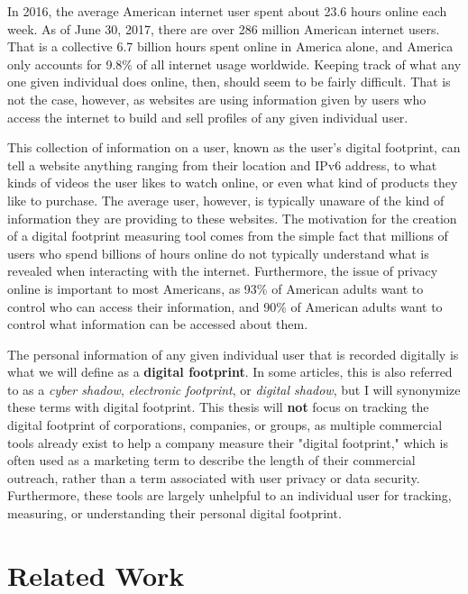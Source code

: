 \documentclass[11pt]{article}
\begin{document}
In 2016, the average American internet user spent about 23.6 hours online each week\cite{digital-future}. As of June 30, 2017, there are over 286 million American internet users. That is a collective 6.7 billion hours spent online in America alone, and America only accounts for 9.8\% of all internet usage worldwide\cite{internet-world-stats}. Keeping track of what any one given individual does online, then, should seem to be fairly difficult. That is not the case, however, as websites are using information given by users who access the internet to build and sell profiles of any given individual user. 

This collection of information on a user, known as the user's digital footprint, can tell a website anything ranging from their location and IPv6 address, to what kinds of videos the user likes to watch online, or even what kind of products they like to purchase. The average user, however, is typically unaware of the kind of information they are providing to these websites. The motivation for the creation of a digital footprint measuring tool comes from the simple fact that millions of users who spend billions of hours online do not typically understand what is revealed when interacting with the internet. Furthermore, the issue of privacy online is important to most Americans, as 93\% of American adults want to control who can access their information, and 90\% of American adults want to control what information can be accessed about them\cite{pew-internet}.

The personal information of any given individual user that is recorded digitally is what we will define as a {\bf digital footprint}. In some articles, this is also referred to as a {\it cyber shadow}, {\it electronic footprint}, or {\it digital shadow}, but I will synonymize these terms with digital footprint. This thesis will {\bf not} focus on tracking the digital footprint of corporations, companies, or groups, as multiple commercial tools already exist to help a company measure their "digital footprint," which is often used as a marketing term to describe the length of their commercial outreach, rather than a term associated with user privacy or data security. Furthermore, these tools are largely unhelpful to an individual user for tracking, measuring, or understanding their personal digital footprint. 

\vspace*{-.1in}
\section{Related Work}
\label{sec:relatedwork}
\vspace*{-.1in}
\end{document}
